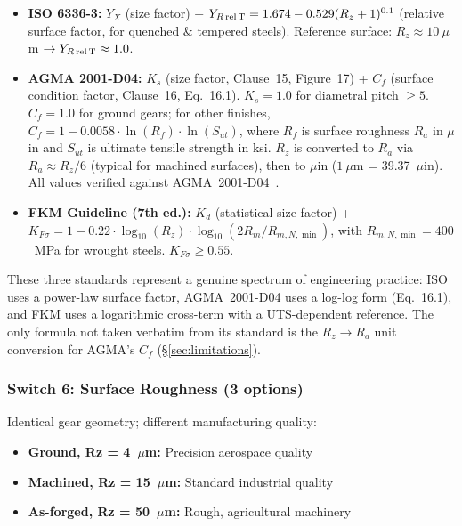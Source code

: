 \documentclass[12pt,a4paper]{article}
\begin{document}
\begin{itemize}
  \item \textbf{ISO 6336-3:} $Y_X$ (size factor) +
        $Y_{R\,\rm rel\,T} = 1.674 - 0.529(R_z+1)^{0.1}$
        (relative surface factor, for quenched \& tempered steels).
        Reference surface: $R_z \approx 10~\mu$m $\rightarrow Y_{R\,\rm rel\,T} \approx 1.0$.
  \item \textbf{AGMA 2001-D04:} $K_s$ (size factor, Clause~15, Figure~17)
        + $C_f$ (surface condition factor, Clause~16, Eq.~16.1).
        $K_s = 1.0$ for diametral pitch $\geq 5$.
        $C_f = 1.0$ for ground gears; for other finishes,
        $C_f = 1 - 0.0058 \cdot \ln(R_f) \cdot \ln(S_{ut})$,
        where $R_f$ is surface roughness $R_a$ in $\mu$in and
        $S_{ut}$ is ultimate tensile strength in ksi. $R_z$ is
        converted to $R_a$ via $R_a \approx R_z / 6$ (typical for
        machined surfaces), then to $\mu$in ($1~\mu$m = 39.37~$\mu$in).
        All values verified against AGMA~2001-D04~\cite{agma2001}.
  \item \textbf{FKM Guideline (7th ed.):} $K_d$ (statistical size factor) +
        $K_{F\sigma} = 1 - 0.22 \cdot \log_{10}(R_z) \cdot
        \log_{10}(2R_m/R_{m,N,\min})$, with $R_{m,N,\min}=400$~MPa
        for wrought steels. $K_{F\sigma} \geq 0.55$.
\end{itemize}

These three standards represent a genuine spectrum of engineering
practice: ISO uses a power-law surface factor, AGMA~2001-D04 uses a
log-log form (Eq.~16.1), and FKM uses a logarithmic cross-term with a
UTS-dependent reference. The only formula not taken verbatim from its
standard is the $R_z \rightarrow R_a$ unit conversion for AGMA's $C_f$
(\S\ref{sec:limitations}).

\subsubsection{Switch 6: Surface Roughness (3 options)}

Identical gear geometry; different manufacturing quality:

\begin{itemize}
  \item \textbf{Ground, Rz = 4~$\mu$m:} Precision aerospace quality
  \item \textbf{Machined, Rz = 15~$\mu$m:} Standard industrial quality
  \item \textbf{As-forged, Rz = 50~$\mu$m:} Rough, agricultural machinery
\end{itemize}
\end{document}
